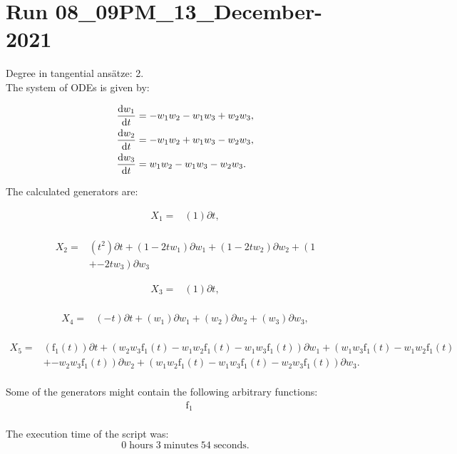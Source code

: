\section*{Run 08\_09PM\_13\_December-2021}
Degree in tangential ansätze:	2.\\
The system of ODEs is given by:

\begin{align*}
\dv{w_{1}}{t}&=- w_{1} w_{2} - w_{1} w_{3} + w_{2} w_{3},\\
\dv{w_{2}}{t}&=- w_{1} w_{2} + w_{1} w_{3} - w_{2} w_{3},\\
\dv{w_{3}}{t}&=w_{1} w_{2} - w_{1} w_{3} - w_{2} w_{3}.\\
\end{align*}

\noindent The calculated generators are:

\begin{align*}
X_{1}=&\left(1 \right)\partial t,\\
\end{align*}

\begin{align*}
X_{2}=&\left(t^{2} \right)\partial t+\left(1- 2 t w_{1} \right)\partial w_{1}+\left(1- 2 t w_{2} \right)\partial w_{2}+\left(1\right.\\
&+\left.- 2 t w_{3} \right)\partial w_{3}
\end{align*}

\begin{align*}
X_{3}=&\left(1 \right)\partial t,\\
\end{align*}

\begin{align*}
X_{4}=&\left(- t \right)\partial t+\left(w_{1} \right)\partial w_{1}+\left(w_{2} \right)\partial w_{2}+\left(w_{3} \right)\partial w_{3},\\
\end{align*}

\begin{align*}
X_{5}=&\left(\operatorname{f_{1}}{\left(t \right)} \right)\partial t+\left(w_{2} w_{3} \operatorname{f_{1}}{\left(t \right)}- w_{1} w_{2} \operatorname{f_{1}}{\left(t \right)}- w_{1} w_{3} \operatorname{f_{1}}{\left(t \right)} \right)\partial w_{1}+\left(w_{1} w_{3} \operatorname{f_{1}}{\left(t \right)}- w_{1} w_{2} \operatorname{f_{1}}{\left(t \right)}\right.\\
&+\left.- w_{2} w_{3} \operatorname{f_{1}}{\left(t \right)} \right)\partial w_{2}+\left(w_{1} w_{2} \operatorname{f_{1}}{\left(t \right)} - w_{1} w_{3} \operatorname{f_{1}}{\left(t \right)} - w_{2} w_{3} \operatorname{f_{1}}{\left(t \right)} \right)\partial w_{3}.\\
\end{align*}



\noindent Some of the generators might contain the following arbitrary functions:
\begin{align*}
&\operatorname{f_{1}}\\
\end{align*}

\noindent The execution time of the script was:
$$0\;\mathrm{hours}\;3\;\mathrm{minutes}\;54 \;\mathrm{seconds}.$$

